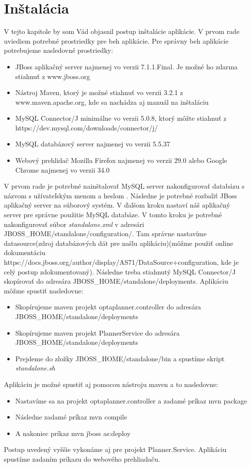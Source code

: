 \chapter{Inštalácia}
{
	V tejto kapitole by som Vád objasnil postup inštalácie aplikácie. V prvom rade uviediem potrebné prostriedky pre beh aplikácie. Pre správny beh aplikácie potrebujeme nasledovné prostriedky:
	\begin{itemize}
	\item JBoss aplikačný server najmenej vo verzii 7.1.1.Final. Je možné ho zdarma stiahnuť z www.jboss.org
	\item Nástroj Maven, ktorý je možné stiahnuť vo verzii 3.2.1 z www.maven.apache.org, kde sa nachádza aj manuál na inštaláciu
	\item MySQL Connector/J minimálne vo verzii 5.0.8, ktorý môžte stiahnuť z https://dev.mysql.com/downloads/connector/j/
	\item MySQL databázový server najmenej vo verzii 5.5.37
	\item Webový prehlidač Mozilla Firefox najmenej vo verzii 29.0 alebo Google Chrome najmenej vo verzii 34.0
	\end{itemize}
	V prvom rade je potrebné nainštalovať MySQL server nakonfigurovať databázu s názvom  s užívateľským menom  a heslom . Následne je potrebné rozbaliť JBoss aplikačný server na súborový systém. V ďalšom kroku nastaví náš aplikačný server pre správne použitie MySQL databáze. V tomto kroku je potrebné nakonfigurovať súbor \emph{standalone.xml} v adresári JBOSS_HOME/standalone/configuration/. Tam správne nastavíme datasource(zdroj databázových dát pre našlu aplikáciu)(môžme použiť online dokumentáciu https://docs.jboss.org/author/display/AS71/DataSource+configuration, kde je celý postup zdokumentovaný). Následne treba stiahnutý MySQL Connector/J skopírovať do adresára JBOSS_HOME/standalone/deployments. Aplikáciu môžme spustiť nasledovne:
	\begin{itemize}
	\item Skopírujeme maven projekt optaplanner.controller do adresára JBOSS_HOME/standalone/deployments
	\item Skopírujeme maven projekt PlannerService do adresára JBOSS_HOME/standalone/deployments
	\item Prejdeme do zložky JBOSS_HOME/standalone/bin a spustíme skript \emph{standalone.sh}
	\end{itemize}
	Aplikáciu je možné spustiť aj pomocou nástroju maven a to nasledovne:
	\begin{itemize}
	\item Nastavíme sa na projekt optaplanner.controller a zadamé príkaz mvn package
	\item Následne zadamé príkaz mvn compile
	\item A nakoniec príkaz mvn jboss as:deploy
	\end{itemize}
	Postup uvedený vyššie vykonáme aj pre projekt Planner.Service. 
	Aplikáciu spustíme zadaním príkazu  do webového prehliadaču.


}
